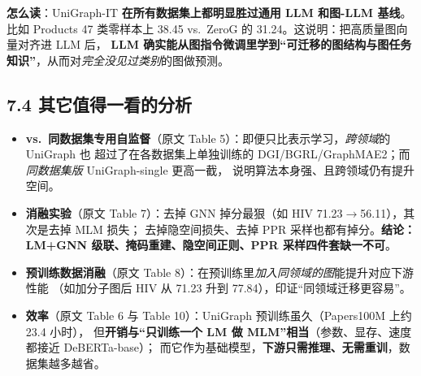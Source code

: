\documentclass[11pt,UTF8,fontset=fandol]{ctexart}
\begin{document}
\textbf{怎么读}：UniGraph-IT \textbf{在所有数据集上都明显胜过通用 LLM 和图-LLM 基线}。
比如 Products 47 类零样本上 38.45 vs.\ ZeroG 的 31.24。这说明：把高质量图向量对齐进 LLM 后，
\textbf{LLM 确实能从图指令微调里学到“可迁移的图结构与图任务知识”}，从而对\emph{完全没见过类别}的图做预测。

\subsection{7.4 其它值得一看的分析}

\begin{itemize}[leftmargin=2em]
  \item \textbf{vs.\ 同数据集专用自监督}（原文 Table 5）：即便只比表示学习，\emph{跨领域}的 UniGraph 也
        超过了在各数据集上单独训练的 DGI/BGRL/GraphMAE2；而\emph{同数据集版} UniGraph-single 更高一截，
        说明算法本身强、且跨领域仍有提升空间。
  \item \textbf{消融实验}（原文 Table 7）：去掉 GNN 掉分最狠（如 HIV 71.23$\to$56.11），其次是去掉 MLM 损失；
        去掉隐空间损失、去掉 PPR 采样也都有掉分。\textbf{结论：LM+GNN 级联、掩码重建、隐空间正则、PPR
        采样四件套缺一不可}。
  \item \textbf{预训练数据消融}（原文 Table 8）：在预训练里\emph{加入同领域的图}能提升对应下游性能
        （如加分子图后 HIV 从 71.23 升到 77.84），印证“同领域迁移更容易”。
  \item \textbf{效率}（原文 Table 6 与 Table 10）：UniGraph 预训练虽久（Papers100M 上约 23.4 小时），
        但\textbf{开销与“只训练一个 LM 做 MLM”相当}（参数、显存、速度都接近 DeBERTa-base）；
        而它作为基础模型，\textbf{下游只需推理、无需重训}，数据集越多越省。
\end{itemize}
\end{document}
